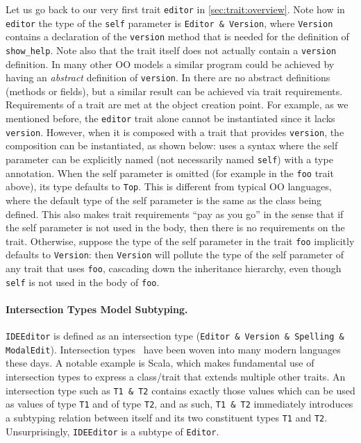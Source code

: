 Let us go back to our very first trait \lstinline{editor} in
\cref{sec:trait:overview}. Note how in \lstinline{editor} the type of the
\lstinline{self} parameter is \lstinline{Editor & Version}, where
\lstinline{Version} contains a declaration of the \lstinline{version} method
that is needed for the definition of \lstinline{show_help}. Note also that the
trait itself does not actually contain a \lstinline{version} definition. In many
other OO models a similar program could be achieved by having an \emph{abstract}
definition of \lstinline{version}. In \sedel there are no abstract definitions
(methods or fields), but a similar result can be achieved via trait
requirements. Requirements of a trait are met at the object creation point. For
example, as we mentioned before, the \lstinline{editor} trait alone cannot be
instantiated since it lacks \lstinline{version}. However, when it is composed
with a trait that provides \lstinline{version}, the composition can be
instantiated, as shown below:
\sedel uses a syntax where the self parameter can be explicitly named (not
necessarily named \lstinline{self}) with a type annotation. When the self
parameter is omitted (for example in the \lstinline{foo} trait above), its type
defaults to \lstinline{Top}. This is different from typical OO languages, where
the default type of the self parameter is the same as the class being defined.
This also makes trait requirements ``pay as you go'' in the sense that if the
self parameter is not used in the body, then there is no requirements on the
trait. Otherwise, suppose the type of the self parameter in the trait
\lstinline{foo} implicitly defaults to \lstinline{Version}:
then \lstinline{Version} will pollute the type of the self parameter of any trait that
uses \lstinline{foo}, cascading down the inheritance hierarchy, even though \lstinline{self}
is not used in the body of \lstinline{foo}.



\paragraph{Intersection Types Model Subtyping.}
\lstinline{IDEEditor} is defined as an intersection type (\lstinline{Editor & Version & Spelling & ModalEdit}).
Intersection types~\citep{coppo1981functional,pottinger1980type} have been woven
into many modern languages these days. A notable example is Scala, which makes
fundamental use of intersection types to express a class/trait that extends
multiple other traits. An intersection type such as \lstinline{T1 & T2} contains
exactly those values which can be used as values of type \lstinline{T1} and of
type \lstinline{T2}, and as such, \lstinline{T1 & T2} immediately introduces a
subtyping relation between itself and its two constituent types \lstinline{T1}
and \lstinline{T2}. Unsurprisingly, \lstinline{IDEEditor} is a subtype of
\lstinline{Editor}.


